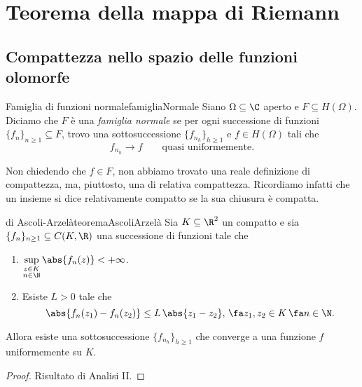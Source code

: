 \chapter{Teorema della mappa di Riemann}
%
%
\section{Compattezza nello spazio delle funzioni olomorfe}

\begin{defn}{Famiglia di funzioni normale}{famigliaNormale}
	Siano \(\Omega\subseteq\C\) aperto e \(F\subseteq H(\Omega)\).
	Diciamo che \(F\) è una \emph{famiglia normale} se per ogni successione di funzioni \(\{f_n\}_{n\ge 1}\subseteq F\), trovo una sottosuccessione \(\{f_{n_h}\}_{h\ge 1}\) e \(f\in H(\Omega)\) tali che
	\[
		f_{n_h} \longrightarrow f \qquad\text{quasi uniformemente}.
	\]
\end{defn}

\begin{oss}
	Non chiedendo che \(f\in F\), non abbiamo trovato una reale definizione di compattezza, ma, piuttosto, una di relativa compattezza.
	Ricordiamo infatti che un insieme si dice relativamente compatto se la sua chiusura è compatta.
\end{oss}

\begin{teor}{di Ascoli-Arzelà}{teoremaAscoliArzelà}
	Sia \(K\subseteq\R^2\) un compatto e sia \(\{f_n\}_{n\ge 1}\subseteq C(K,\R)\) una successione di funzioni tale che
	\begin{enumerate}
		\item \(\displaystyle \sup_{\substack{z\in K\\n\in\N}} \abs{f_n(z)} < +\infty\).
		\item Esiste \(L>0\) tale che
		      \[
			      \abs{f_n(z_1)-f_n(z_2)} \le L\,\abs{z_1-z_2},\,\fa z_1,z_2\in K\,\fa n\in\N.
		      \]
	\end{enumerate}
	Allora esiste una sottosuccessione \(\{f_{n_h}\}_{h\ge 1}\) che converge a una funzione \(f\) uniformemente su \(K\).
\end{teor}

\begin{proof}
	Risultato di Analisi II.
\end{proof}

